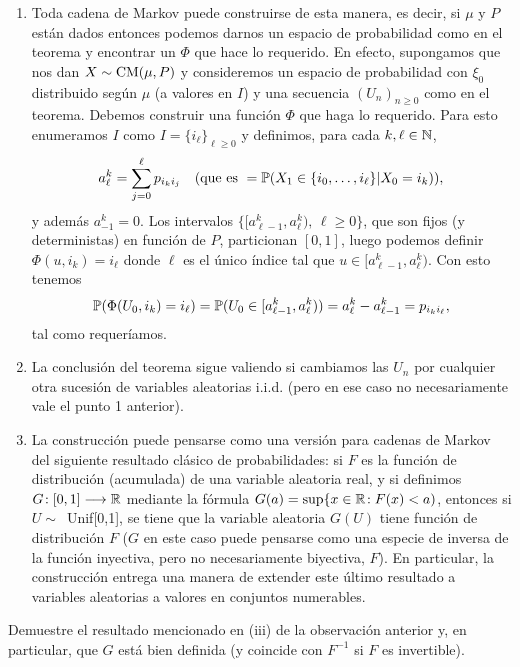 \begin{rem}
\leavevmode
\begin{enumerate}
\item Toda cadena de Markov puede construirse de esta manera, es decir, si $\mu$ y $P$ están dados entonces podemos darnos un espacio de probabilidad como en el teorema y encontrar un $\Phi$ que hace lo requerido.
\lsep
En efecto, supongamos que nos dan $X\sim\text{\upshape{CM}}(\mu,P)$ y consideremos un espacio de probabilidad con $\xi_0$ distribuido según $\mu$ (a valores en $I$) y una secuencia $(U_n)_{n\geq0}$ como en el teorema.
Debemos construir una función $\Phi$ que haga lo requerido.
Para esto enumeramos $I$ como $I=\{i_\ell\}_{\ell\geq0}$ y definimos, para cada $k,\ell\in\mathbb{N}$,
\[a^{k}_\ell=\sum_{j=0}^\ell p_{i_ki_j}\quad\text{\upshape{(que es }}=\mathbb{P}(X_1\in\{i_0,\dotsc,i_\ell\}|X_0=i_k)\text{\upshape{)}},\]
y además $a^k_{-1}=0$.
Los intervalos $\{[a^k_{\ell-1},a^k_\ell),\,\ell\geq0\}$, que son fijos (y deterministas) en función de $P$, particionan $[0,1]$, luego podemos definir $\Phi(u,i_k)=i_\ell$ donde $\ell$ es el único índice tal que $u\in[a^k_{\ell-1},a^k_\ell)$.
Con esto tenemos
\[\mathbb{P}(\Phi(U_0,i_k)=i_\ell)=\mathbb{P}(U_0\in[a^k_{\ell-1},a^k_\ell))=a^k_\ell-a^k_{\ell-1}=p_{i_ki_\ell},\]
tal como requeríamos.
\item La conclusión del teorema sigue valiendo si cambiamos las $U_n$ por cualquier otra sucesión de variables aleatorias i.i.d. (pero en ese caso no necesariamente vale el punto 1 anterior).
\item La construcción puede pensarse como una versión para cadenas de Markov del siguiente resultado clásico de probabilidades: si $F$ es  la función de distribución (acumulada) de una variable aleatoria real, y si definimos $G\!:[0,1]\longrightarrow\mathbb{R}$ mediante la fórmula $G(a)=\sup\{x\in\mathbb{R}\!:F(x)<a)$, entonces si $U\sim$~Unif[0,1], se tiene que la variable aleatoria $G(U)$ tiene función de distribución $F$ ($G$ en este caso puede pensarse como una especie de inversa de la función inyectiva, pero no necesariamente biyectiva, $F$).
\lsep 
En particular, la construcción entrega una manera de extender este último resultado a variables aleatorias a valores en conjuntos numerables.
\end{enumerate}
\end{rem}

\begin{exer}
Demuestre el resultado mencionado en (iii) de la observación anterior y, en particular, que $G$ está bien definida (y coincide con $F^{-1}$ si $F$ es invertible).
\end{exer}


